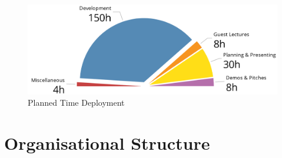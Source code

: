 \documentclass[a4paper,10pt,DIV10,openright,openbib]{scrreprt}
\begin{document}
\begin{figure}[h]
  \centring
  \includegraphics[width=\textwidth]{pie.png}
  \caption{Planned Time Deployment}
\end{figure}

{\let\clearpage\relax \chapter{Organisational Structure}}
\end{document}
